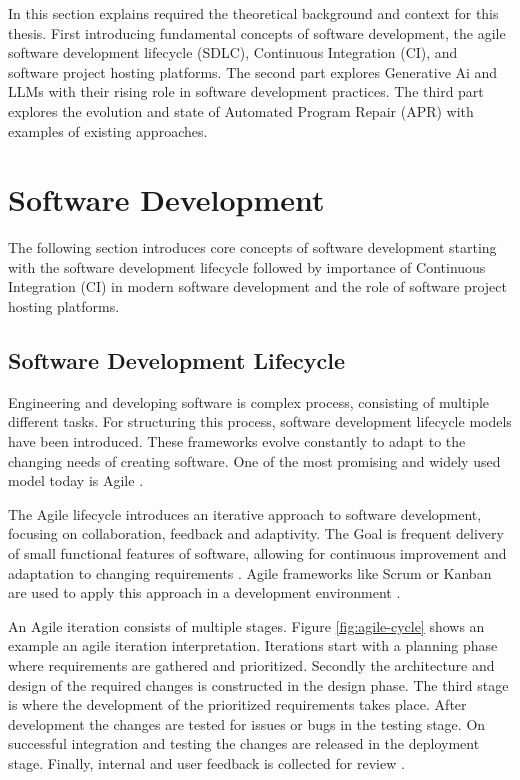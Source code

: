 In this section explains required the theoretical background and context for this thesis. First introducing fundamental concepts of software development, the agile software development lifecycle (SDLC), Continuous Integration (CI), and software project hosting platforms. The second part explores Generative Ai and LLMs with their rising role in software development practices. The third part explores the evolution and state of Automated Program Repair (APR) with examples of existing approaches.

\section{Software Development}

The following section introduces core concepts of software development starting with the software development lifecycle followed by importance of Continuous Integration (CI) in modern software development and the role of software project hosting platforms.

\subsection{Software Development Lifecycle}
Engineering and developing software is complex process, consisting of multiple different tasks. For structuring this process, software development lifecycle models have been introduced. These frameworks evolve constantly to adapt to the changing needs of creating software. One of the most promising and widely used model today is Agile \cite{rupareliaSoftwareDevelopmentLifecycle2010, abrahamssonAgileSoftwareDevelopment2017}.

The Agile lifecycle introduces an iterative approach to software development, focusing on collaboration, feedback and adaptivity. The Goal is frequent delivery of small functional features of software, allowing for continuous improvement and adaptation to changing requirements \cite{rupareliaSoftwareDevelopmentLifecycle2010, abrahamssonAgileSoftwareDevelopment2017}. Agile frameworks like Scrum or Kanban are used to apply this approach in a development environment \cite{zayatFrameworkStudyAgile2020}.

An Agile iteration consists of multiple stages. Figure \ref{fig:agile-cycle} shows an example an agile iteration interpretation. Iterations start with a planning phase where requirements are gathered and prioritized. Secondly the architecture and design of the required changes is constructed in the design phase. The third stage is where the development of the prioritized requirements takes place. After development the changes are tested for issues or bugs in the testing stage. On successful integration and testing the changes are released in the deployment stage. Finally, internal and user feedback is collected for review \cite{huoSoftwareQualityAgile2004}.

